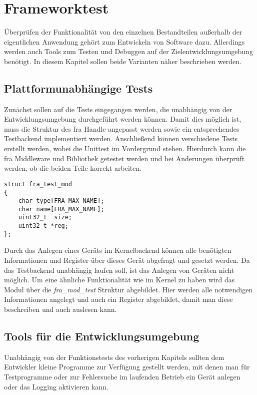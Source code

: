 \chapter{Frameworktest} \label{sec:test}
Überprüfen der Funktionalität von den einzelnen Bestandteilen außerhalb der eigentlichen Anwendung gehört zum Entwickeln von Software dazu. %
Allerdings werden auch Tools zum Testen und Debuggen auf der Zielentwicklungsumgebung benötigt. 
In diesem Kapitel sollen beide Varianten näher beschrieben werden.

\section{Plattformunabhängige Tests}
Zunächst sollen auf die Tests eingegangen werden, die unabhängig von der Entwicklungsumgebung durchgeführt werden können. 
Damit dies möglich ist, muss die Struktur des \ac{fra} Handle angepasst werden sowie ein entsprechendes Testbackend implementiert werden. Anschließend können verschiedene Tests erstellt werden, wobei die Unittest im Vordergrund stehen. Hierdurch kann die \ac{fra} Middleware und Bibliothek getestet werden und bei Änderungen überprüft werden, ob die beiden Teile korrekt arbeiten.


\begin{lstlisting}
struct fra_test_mod
{
	char type[FRA_MAX_NAME];
	char name[FRA_MAX_NAME];
	uint32_t  size;
	uint32_t *reg;
};
\end{lstlisting}


Durch das Anlegen eines Geräts im Kernelbackend können alle benötigten Informationen und Register über dieses Gerät abgefragt und gesetzt werden. Da das Testbackend unabhängig laufen soll, ist das Anlegen von Geräten nicht möglich. Um eine ähnliche Funktionalität wie im Kernel zu haben wird das Modul über die \textit{fra\_mod\_test} Struktur abgebildet. Hier werden alle notwendigen Informationen angelegt und auch ein Register abgebildet, damit man diese beschreiben und auch auslesen kann.

 
\section{Tools für die Entwicklungsumgebung}
Unabhängig von der Funktionstests des vorherigen Kapitels sollten dem Entwickler kleine Programme zur Verfügung gestellt werden, mit denen man für Testprogramme oder zur Fehlersuche im laufenden Betrieb ein Gerät anlegen oder das Logging aktivieren kann.\\


